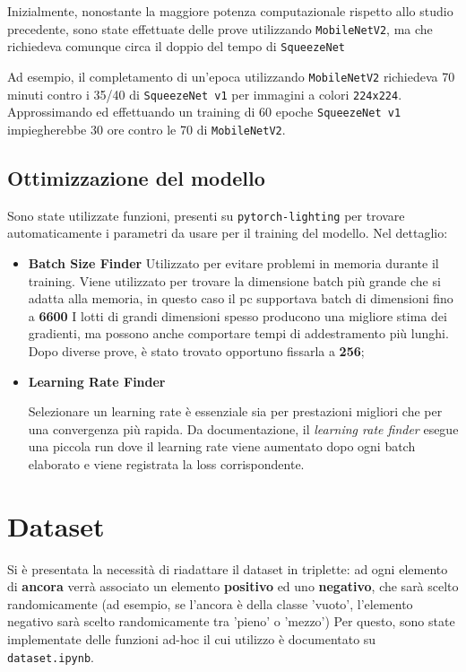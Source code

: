\documentclass[11pt]{article}
\begin{document}
Inizialmente, nonostante la maggiore potenza computazionale rispetto allo studio precedente,
sono state effettuate delle prove utilizzando \texttt{MobileNetV2}, ma che richiedeva
comunque circa il doppio del tempo di \texttt{SqueezeNet}

Ad esempio, il completamento di un'epoca utilizzando \texttt{MobileNetV2} richiedeva 70 minuti
contro i 35/40 di \texttt{SqueezeNet v1} per immagini a colori \texttt{224x224}. Approssimando ed effettuando un training di 60 epoche \texttt{SqueezeNet v1} impiegherebbe 30 ore contro le 70 di \texttt{MobileNetV2}.

\subsection{Ottimizzazione del modello}

Sono state utilizzate funzioni, presenti su \texttt{pytorch-lighting} per trovare automaticamente i parametri da usare per il training del modello.
Nel dettaglio:

\begin{itemize}
    \item {\textbf{Batch Size Finder} 
        Utilizzato per evitare problemi in memoria durante il training. Viene utilizzato
        per trovare la dimensione batch più grande che si adatta alla memoria, in questo caso il pc supportava batch di dimensioni fino a \textbf{6600} I lotti di grandi
        dimensioni spesso producono una migliore stima dei gradienti,
        ma possono anche comportare tempi di addestramento più lunghi. Dopo diverse prove, è stato trovato opportuno fissarla a \textbf{256}; 
    }
    \item \textbf{Learning Rate Finder} {

        Selezionare un learning rate è essenziale sia per
        prestazioni migliori che per una convergenza più rapida. Da documentazione,
        il \textit{learning rate finder} esegue una piccola run dove il learning rate viene aumentato dopo ogni batch elaborato
        e viene registrata la loss corrispondente.
    }

\end{itemize}

\section{Dataset}

Si è presentata la necessità di riadattare il dataset in triplette: ad ogni elemento di \textbf{ancora} verrà
associato un elemento \textbf{positivo} ed uno \textbf{negativo}, che sarà scelto randomicamente 
(ad esempio, se l'ancora è della classe 'vuoto', l'elemento negativo sarà scelto randomicamente tra 'pieno' o 'mezzo')
Per questo, sono state implementate delle funzioni ad-hoc il cui utilizzo è documentato su \texttt{dataset.ipynb}. 
\end{document}
